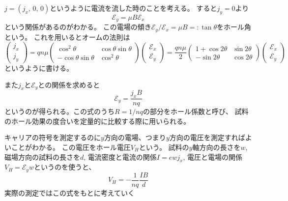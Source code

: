 \documentclass[11pt,dvipdfmx,a4paper]{jsarticle}
\numberwithin{equation}{section}
\begin{document}
\(j=(j_x,\,0,\,0)\)というように電流を流した時のことを考える。
すると\(j_y=0\)より
\begin{equation}
	\mathscr{E}_y = \mu B \mathscr{E}_x
\end{equation}
という関係があるのがわかる。
この電場の傾き\(\mathscr{E}_y/\mathscr{E}_x=\mu B =:\tan\theta\)をホール角という。
これを用いるとオームの法則は
\begin{equation}
	\begin{pmatrix}
		j_x \\ j_y
	\end{pmatrix}
	= qn\mu
	\begin{pmatrix}
		\cos^2\theta & \cos\theta\sin\theta\\
		-\cos\theta\sin\theta & \cos^2\theta
	\end{pmatrix}
	\begin{pmatrix}
		\mathscr{E}_x \\ \mathscr{E}_y
	\end{pmatrix}
	= \frac{qn\mu}{2}
	\begin{pmatrix}
		1+\cos 2\theta & \sin 2\theta\\
		-\sin 2\theta & \cos 2\theta
	\end{pmatrix}
	\begin{pmatrix}
		\mathscr{E}_x \\ \mathscr{E}_y
	\end{pmatrix}
\end{equation}
というように書ける。

また\(j_x\)と\(\mathscr{E}_y\)との関係を求めると
\begin{equation}
	\mathscr{E}_y = \frac{j_x B}{nq}
\end{equation}
というのが得られる。この式のうち\(R=1/nq\)の部分をホール係数と呼び、
試料のホール効果の度合いを定量的に比較する際に用いられる。

キャリアの符号を測定するのに\(y\)方向の電場、つまり\(y\)方向の電圧を測定すればよいことがわかる。
この電圧をホール電圧\(V_H\)という。
試料の\(y\)軸方向の長さを\(w\),
磁場方向の試料の長さを\(d\),
電流密度と電流の関係\(I=ewj_x\),
電圧と電場の関係\(V_H = \mathscr{E}_y w\)というのを使うと、
\begin{equation}
	V_H = -\frac{1}{nq} \frac{IB}{d}
\end{equation}
実際の測定ではこの式をもとに考えていく
\end{document}
